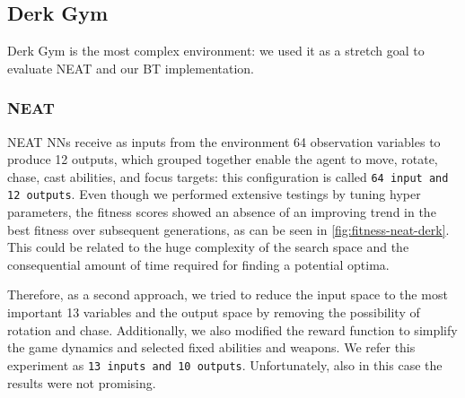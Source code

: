 \subsection{Derk Gym}
Derk Gym is the most complex environment: we used it as a stretch goal to evaluate NEAT and our BT implementation.

\subsubsection{NEAT}
NEAT NNs receive as inputs from the environment 64 observation variables to produce 12 outputs, which grouped together enable the agent to move, rotate, chase, cast abilities, and focus targets: this configuration is called \texttt{64 input and 12 outputs}. Even though we performed extensive testings by tuning hyper parameters, the fitness scores showed an absence of an improving trend in the best fitness over subsequent generations, as can be seen in \cref{fig:fitness-neat-derk}. This could be related to the huge complexity of the search space and the consequential amount of time required for finding a potential optima.


Therefore, as a second approach, we tried to reduce the input space to the most important 13 variables and the output space by removing the possibility of rotation and chase. Additionally, we also modified the reward function to simplify the game dynamics and selected fixed abilities and weapons. We refer this experiment as \texttt{13 inputs and 10 outputs}. Unfortunately, also in this case the results were not promising.

